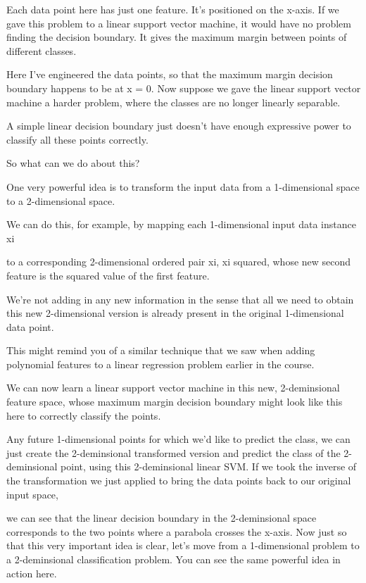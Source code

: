 \begin{multicols}{2}
Each data point here has just one feature. It's positioned on the x-axis. If we gave this problem to a linear support vector machine, it would have no problem finding the decision boundary. It gives the maximum margin between points of different classes. 

Here I've engineered the data points, so that the maximum margin decision boundary happens to be at x = 0. Now suppose we gave the linear support vector machine a harder problem, where the classes are no longer linearly separable. 

A simple linear decision boundary just doesn't have enough expressive power to classify all these points correctly. 

So what can we do about this? 

One very powerful idea is to transform the input data from a 1-dimensional space to a 2-dimensional space. 

We can do this, for example, by mapping each 1-dimensional input data instance xi 

to a corresponding 2-dimensional ordered pair xi, xi squared, whose new second feature is the squared value of the first feature. 

We're not adding in any new information in the sense that all we need to obtain this new 2-dimensional version is already present in the original 1-dimensional data point. 

This might remind you of a similar technique that we saw when adding polynomial features to a linear regression problem earlier in the course. 

We can now learn a linear support vector machine in this new, 2-deminsional feature space, whose maximum margin decision boundary might look like this here to correctly classify the points. 

Any future 1-dimensional points for which we'd like to predict the class, we can just create the 2-deminsional transformed version and predict the class of the 2-deminsional point, using this 2-deminsional linear SVM. If we took the inverse of the transformation we just applied to bring the data points back to our original input space, 

we can see that the linear decision boundary in the 2-deminsional space corresponds to the two points where a parabola crosses the x-axis. Now just so that this very important idea is clear, let's move from a 1-dimensional problem to a 2-deminsional classification problem. You can see the same powerful idea in action here. 


\end{multicols}
